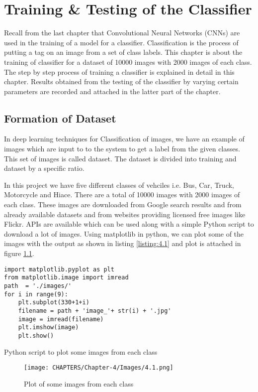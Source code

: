 \chapter{Training \& Testing of the
Classifier}
\label{Chapter 4}
Recall from the last chapter that Convolutional Neural Networks (CNNs) are used
in the training of a model for a classifier. Classification is the process
of putting a tag on an image from a set of class labels. This chapter is about the
training of classifier for a dataset of 10000 images with 2000 images of each class.
The step by step process of training a classifier is explained in detail in this chapter. Results obtained from the testing of the classifier by varying certain parameters are recorded and attached
in the latter part of the chapter.
\section{Formation of Dataset}
In deep learning techniques for Classification of images, we have
an example of images which are input to to the system to get a
label from the given classes. This set of images is called dataset.
The dataset is divided into training and dataset by a specific ratio.


In this project we have five different classes of vehciles i.e. Bus, Car, Truck, Motorcycle
and Hiace. There are a total of 10000 images with 2000 images of each 
class. These images are downloaded from Google search results and from already available
datasets and from websites providing licensed free images like Flickr. APIs are available which
can be used along with a simple Python script to download a lot of images.
Using matplotlib in python, we can plot some of the images with the output as
shown in listing \ref{listing:4.1} and plot is attached in figure
\ref{fig:4.1}.
\linespread{1.0}
\begin{listing}[H]
\begin{verbatim}
import matplotlib.pyplot as plt
from matplotlib.image import imread  
path  = './images/'
for i in range(9):
    plt.subplot(330+1+i)
    filename = path + 'image_'+ str(i) + '.jpg'
    image = imread(filename)
    plt.imshow(image)    
    plt.show()
\end{verbatim}
\caption{Python script to plot some images from each class}
\label{listing:4.1}
\end{listing}

\begin{figure}[H]
    \centering
    \captionsetup{justification = centering}
    \texttt{[image: CHAPTERS/Chapter-4/Images/4.1.png]}
    \caption{Plot of some images from each class} 
    \label{fig:4.1}
  \end{figure}


